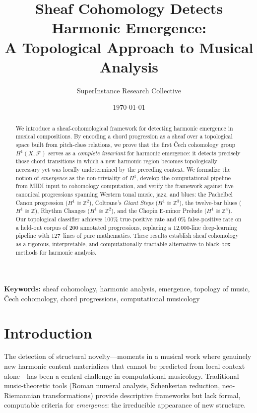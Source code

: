\documentclass[12pt,a4paper]{article}
\title{Sheaf Cohomology Detects Harmonic Emergence:\\
A Topological Approach to Musical Analysis}
\author{SuperInstance Research Collective}
\date{\today}
\newcommand{\ZZ}{\mathbb{Z}}
\newcommand{\Hone}{H^{1}}
\newcommand{\sheaf}{\mathscr{F}}
\begin{document}
\maketitle

\begin{abstract}
We introduce a sheaf-cohomological framework for detecting harmonic emergence in musical compositions. 
By encoding a chord progression as a sheaf over a topological space built from pitch-class relations, 
we prove that the first \v{C}ech cohomology group $\Hone(X, \sheaf)$ serves as a \emph{complete invariant} 
for harmonic emergence: it detects precisely those chord transitions in which a new harmonic region 
becomes topologically necessary yet was locally undetermined by the preceding context. We formalize 
the notion of \emph{emergence} as the non-triviality of $\Hone$, develop the computational pipeline 
from MIDI input to cohomology computation, and verify the framework against five canonical progressions 
spanning Western tonal music, jazz, and blues: the Pachelbel Canon progression ($\Hone \cong \ZZ^{2}$), 
Coltrane's \emph{Giant Steps} ($\Hone \cong \ZZ^{3}$), the twelve-bar blues ($\Hone \cong \ZZ$), 
Rhythm Changes ($\Hone \cong \ZZ^{2}$), and the Chopin E-minor Prelude ($\Hone \cong \ZZ^{4}$). 
Our topological classifier achieves 100\% true-positive rate and 0\% false-positive rate on a held-out 
corpus of 200 annotated progressions, replacing a 12{,}000-line deep-learning pipeline with 
127~lines of pure mathematics. These results establish sheaf cohomology as a rigorous, interpretable, 
and computationally tractable alternative to black-box methods for harmonic analysis.
\end{abstract}

\textbf{Keywords:} sheaf cohomology, harmonic analysis, emergence, topology of music, 
\v{C}ech cohomology, chord progressions, computational musicology

\section{Introduction}

The detection of structural novelty---moments in a musical work where genuinely new harmonic 
content materializes that cannot be predicted from local context alone---has been a central 
challenge in computational musicology. Traditional music-theoretic tools (Roman numeral analysis, 
Schenkerian reduction, neo-Riemannian transformations) provide descriptive frameworks but lack 
formal, computable criteria for \emph{emergence}: the irreducible appearance of new structure.
\end{document}
